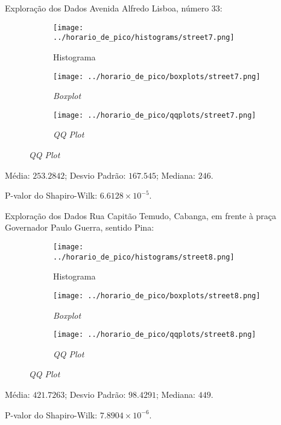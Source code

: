 \begin{frame}{Exploração dos Dados}
Avenida Alfredo Lisboa, número 33:
\vskip 0.05cm
\begin{figure}
	\centering
	\begin{subfigure}{.33\textwidth}
		\centering
		\texttt{[image: ../horario\_de\_pico/histograms/street7.png]}
		\caption*{Histograma}
	\end{subfigure}%
	\begin{subfigure}{.33\textwidth}
		\centering
		\texttt{[image: ../horario\_de\_pico/boxplots/street7.png]}
		\caption*{\textit{Boxplot}}
	\end{subfigure}
	\begin{subfigure}{.32\textwidth}
		\centering
		\texttt{[image: ../horario\_de\_pico/qqplots/street7.png]}
		\caption*{\textit{QQ Plot}}
	\end{subfigure}
\end{figure}
\vskip 0.05cm
Média: $253.2842$; Desvio Padrão: $167.545$; Mediana: $246$.

P-valor do Shapiro-Wilk: $6.6128 \times 10^{-5}$.
\end{frame}

\begin{frame}{Exploração dos Dados}
Rua Capitão Temudo, Cabanga, em frente à praça Governador Paulo Guerra, sentido
Pina:
\begin{figure}
	\centering
	\begin{subfigure}{.33\textwidth}
		\centering
		\texttt{[image: ../horario\_de\_pico/histograms/street8.png]}
		\caption*{Histograma}
	\end{subfigure}%
	\begin{subfigure}{.33\textwidth}
		\centering
		\texttt{[image: ../horario\_de\_pico/boxplots/street8.png]}
		\caption*{\textit{Boxplot}}
	\end{subfigure}
	\begin{subfigure}{.32\textwidth}
		\centering
		\texttt{[image: ../horario\_de\_pico/qqplots/street8.png]}
		\caption*{\textit{QQ Plot}}
	\end{subfigure}
\end{figure}
Média: $421.7263$; Desvio Padrão: $98.4291$; Mediana: $449$.

P-valor do Shapiro-Wilk: $7.8904 \times 10^{-6}$.
\end{frame}

